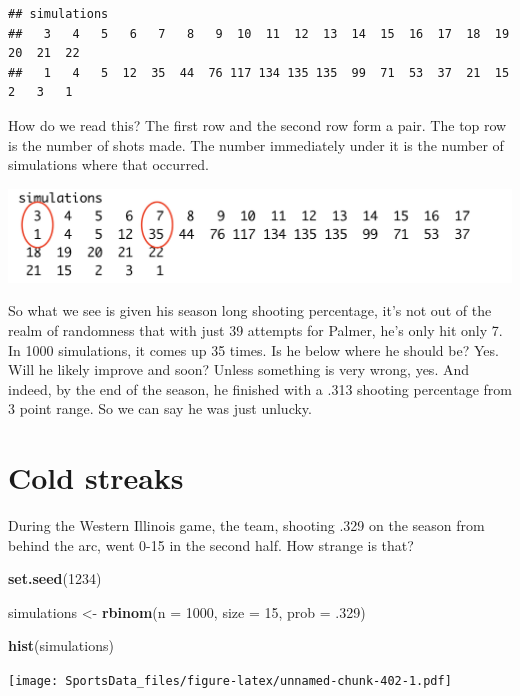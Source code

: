 \documentclass[
]{book}
\newenvironment{Shaded}{\begin{snugshade}}{\end{snugshade}}
\newcommand{\DataTypeTok}[1]{\textcolor[rgb]{0.13,0.29,0.53}{#1}}
\newcommand{\DecValTok}[1]{\textcolor[rgb]{0.00,0.00,0.81}{#1}}
\newcommand{\FloatTok}[1]{\textcolor[rgb]{0.00,0.00,0.81}{#1}}
\newcommand{\KeywordTok}[1]{\textcolor[rgb]{0.13,0.29,0.53}{\textbf{#1}}}
\newcommand{\NormalTok}[1]{#1}
\newcommand{\StringTok}[1]{\textcolor[rgb]{0.31,0.60,0.02}{#1}}
\begin{document}
\begin{verbatim}
## simulations
##   3   4   5   6   7   8   9  10  11  12  13  14  15  16  17  18  19  20  21  22 
##   1   4   5  12  35  44  76 117 134 135 135  99  71  53  37  21  15   2   3   1
\end{verbatim}

How do we read this? The first row and the second row form a pair. The top row is the number of shots made. The number immediately under it is the number of simulations where that occurred.

\includegraphics[width=23.06in]{images/simulations1}

So what we see is given his season long shooting percentage, it's not out of the realm of randomness that with just 39 attempts for Palmer, he's only hit only 7. In 1000 simulations, it comes up 35 times. Is he below where he should be? Yes. Will he likely improve and soon? Unless something is very wrong, yes. And indeed, by the end of the season, he finished with a .313 shooting percentage from 3 point range. So we can say he was just unlucky.

\hypertarget{cold-streaks}{%
\section{Cold streaks}\label{cold-streaks}}

During the Western Illinois game, the team, shooting .329 on the season from behind the arc, went 0-15 in the second half. How strange is that?

\begin{Shaded}
\begin{Highlighting}[]
\KeywordTok{set.seed}\NormalTok{(}\DecValTok{1234}\NormalTok{)}

\NormalTok{simulations <-}\StringTok{ }\KeywordTok{rbinom}\NormalTok{(}\DataTypeTok{n =} \DecValTok{1000}\NormalTok{, }\DataTypeTok{size =} \DecValTok{15}\NormalTok{, }\DataTypeTok{prob =} \FloatTok{.329}\NormalTok{)}

\KeywordTok{hist}\NormalTok{(simulations)}
\end{Highlighting}
\end{Shaded}

\texttt{[image: SportsData\_files/figure-latex/unnamed-chunk-402-1.pdf]}
\end{document}
